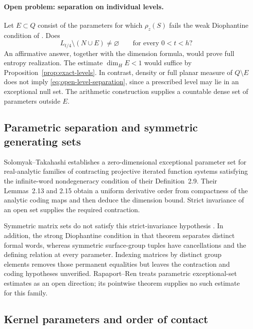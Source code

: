 \documentclass[11pt,letterpaper]{amsart}
\theoremstyle{definition}
\theoremstyle{remark}
\numberwithin{equation}{section}
\begin{document}
\paragraph{Open problem: separation on individual levels.}
Let $E\subset Q$ consist of the parameters for which $\rho_z(S)$
fails the weak Diophantine condition of \cite[Definition~1.1]{RR}.
Does
\begin{equation}\label{eq:open-level-separation}
 L_{t/4}\setminus(N\cup E)\ne\varnothing
 \qquad\text{for every }0<t<h?
\end{equation}
An affirmative answer, together with the dimension formula, would
prove full entropy realization. The estimate $\dim_H E<1$ would
suffice by Proposition~\ref{prop:exact-levels}. In contrast, density
or full planar measure of $Q\setminus E$ does not imply
\eqref{eq:open-level-separation}, since a prescribed level may lie
in an exceptional null set. The arithmetic construction supplies a
countable dense set of parameters outside $E$.

\subsection{Parametric separation and symmetric generating sets}

Solomyak--Takahashi \cite[Theorem~2.10]{ST} establishes a
zero-dimensional exceptional parameter set for real-analytic families
of contracting projective iterated function systems satisfying the
infinite-word nondegeneracy condition of their Definition~2.9.
Their Lemmas~2.13 and 2.15 obtain a uniform derivative order from
compactness of the analytic coding maps and then deduce the dimension
bound. Strict invariance of an open set supplies the required
contraction.

Symmetric matrix sets do not satisfy this strict-invariance hypothesis
\cite[Remark~1.3(1)]{ST}. In addition, the strong Diophantine condition
in that theorem separates distinct formal words, whereas symmetric
surface-group tuples have cancellations and the defining relation at
every parameter. Indexing matrices by distinct group elements removes
those permanent equalities but leaves the contraction and coding
hypotheses unverified. Rapaport--Ren \cite[Section~1.2]{RR} treats
parametric exceptional-set estimates as an open direction; its
pointwise theorem supplies no such estimate for this family.

\subsection{Kernel parameters and order of contact}
\end{document}
